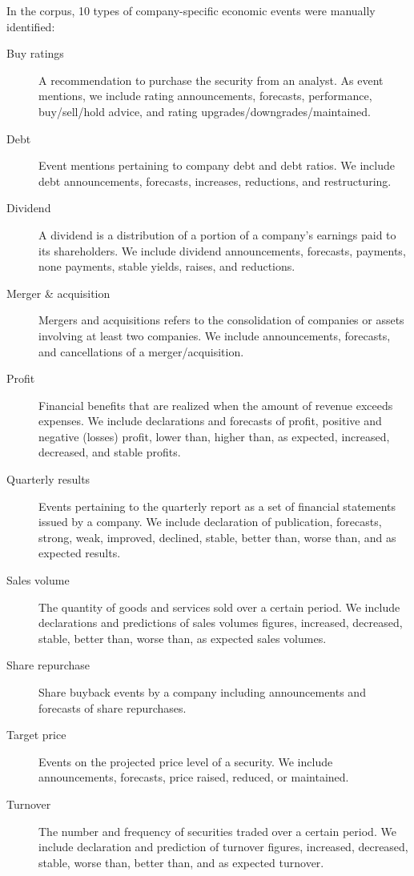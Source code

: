 \documentclass[11pt,a4paper]{article}
\begin{document}
In the corpus, 10 types of company-specific economic events were manually identified:
\begin{description}
    \item [Buy ratings] A recommendation to purchase the security from an analyst. As event mentions, we include rating announcements, forecasts, performance, buy/sell/hold advice, and rating upgrades/downgrades/maintained.
    \item [Debt] Event mentions pertaining to company debt and debt ratios. We include debt announcements, forecasts, increases, reductions, and restructuring. 
    \item [Dividend] A dividend is a distribution of a portion of a company's earnings paid to its shareholders. We include dividend announcements, forecasts, payments, none payments, stable yields, raises, and reductions.
    \item [Merger \& acquisition] Mergers and acquisitions refers to the consolidation of companies or assets involving at least two companies. We include announcements, forecasts, and cancellations of a merger/acquisition.
    \item [Profit] Financial benefits that are realized when the amount of revenue exceeds expenses. We include declarations and forecasts of profit, positive and negative (losses) profit, lower than, higher than, as expected, increased, decreased, and stable profits.
    \item [Quarterly results] Events pertaining to the quarterly report as a set of financial statements issued by a company. We include declaration of publication, forecasts, strong, weak, improved, declined, stable, better than, worse than, and as expected results.
    \item [Sales volume] The quantity of goods and services sold over a certain period. We include declarations and predictions of sales volumes figures, increased, decreased, stable, better than, worse than, as expected sales volumes.
    \item [Share repurchase] Share buyback events by a company including announcements and forecasts of share repurchases.
    \item [Target price] Events on the projected price level of a security. We include announcements, forecasts, price raised, reduced, or maintained.
    \item [Turnover] The number and frequency of securities traded over a certain period. We include declaration and prediction of turnover figures, increased, decreased, stable, worse than, better than, and as expected turnover.
\end{description}
\end{document}
